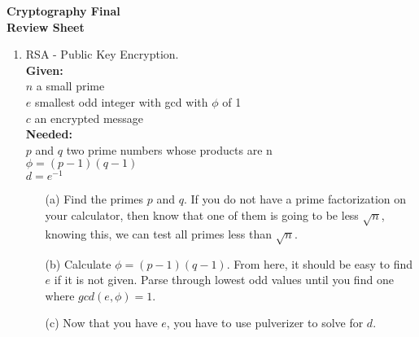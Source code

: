 \documentclass[12pt]{amsart}
\begin{document}
\thispagestyle{empty}

\begin{center}
{\bf Cryptography Final}\\
{\bf Review Sheet}\\
\end{center}
\begin{enumerate}
\item RSA - Public Key Encryption. \\
{\bf Given: }\\ $n$ a small prime\\ $e$ smallest odd integer with gcd with $\phi$ of 1\\ $c$ an encrypted message\\
{\bf Needed: }\\ $p$ and $q$ two prime numbers whose products are n\\ $\phi = (p-1)(q-1)$\\
$d = e^{-1}$\\
\begin{itemize}
\item[(a)] Find the primes $p$ and $q$.  If you do not have a prime factorization on your calculator, then know that one of them is going to be less $\sqrt{n}$, knowing this, we can test all primes less than $\sqrt{n}$.\\
\item[(b)] Calculate $\phi = (p-1)(q-1)$.  From here, it should be easy to find $e$ if it is not given.  Parse through lowest odd values until you find one where $gcd(e, \phi) = 1$.
\item[(c)] Now that you have $e$, you have to use pulverizer to solve for $d$.  
\end{itemize}

\end{enumerate}
\end{document}
